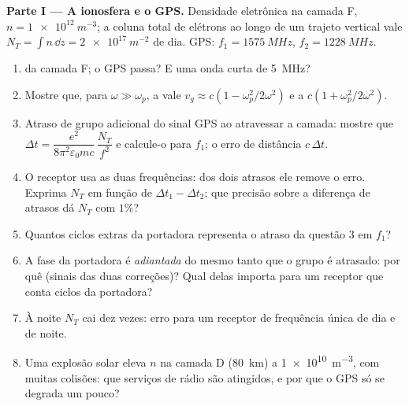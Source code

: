\begin{problem}
\label{pb:b2:waves-in-media:1}

\medskip
\noindent\textbf{Parte I --- A ionosfera e o GPS.}
Densidade eletrônica na camada F, $n = \qty{1e12}{m^{-3}}$; a coluna total de
elétrons ao longo de um trajeto vertical vale $N_T = \int n\,\dd z = \qty{2e17}{m^{-2}}$ de
dia. GPS: $f_1 = \qty{1575}{MHz}$, $f_2 = \qty{1228}{MHz}$.
\begin{enumerate}
  \item {} da camada F; o GPS passa? E uma onda
        curta de \qty{5}{MHz}?
  \item Mostre que, para $\omega \gg \omega_p$, a  vale $v_g \approx c(1 -
        \omega_p^2/2\omega^2)$ e a  $c(1 + \omega_p^2/2\omega^2)$.
  \item Atraso de grupo adicional do sinal GPS ao atravessar a camada: mostre que
        $\Delta t = \dfrac{e^2}{8\pi^2\varepsilon_0mc}\,\dfrac{N_T}{f^2}$ e calcule-o para
        $f_1$; o erro de distância $c\,\Delta t$.
  \item O receptor usa as duas frequências: dos dois atrasos ele
        remove o erro. Exprima $N_T$ em função de $\Delta t_1 - \Delta t_2$;
        que precisão sobre a diferença de atrasos dá $N_T$ com $1\%$?
  \item Quantos ciclos extras da portadora representa o atraso da questão 3
        em $f_1$?
  \item A fase da portadora é \emph{adiantada} do mesmo
        tanto que o grupo é atrasado: por quê (sinais das duas
        correções)? Qual delas importa para um receptor que conta
        ciclos da portadora?
  \item À noite $N_T$ cai dez vezes: erro para um receptor de
        frequência única de dia e de noite.
  \item Uma explosão solar eleva $n$ na camada D (\qty{80}{km}) a
        \qty{1e10}{m^{-3}}, com muitas colisões: que serviços de rádio são
        atingidos, e por que o GPS só se degrada um pouco?
\end{enumerate}


\end{problem}
